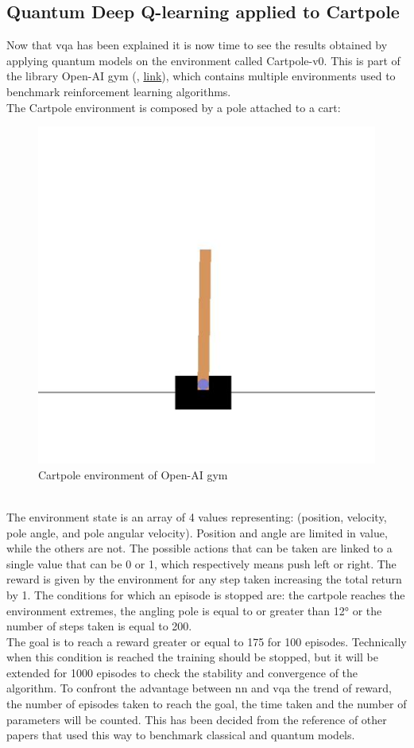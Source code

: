 \subsection{Quantum Deep Q-learning applied to Cartpole} 
Now that \acrlong{vqa} has been explained it is now time to see the results obtained by applying quantum models on the environment called Cartpole-v0. This is part of the library Open-AI gym (\cite{1606.01540}, \href{https://www.gymlibrary.ml/}{link}), which contains multiple environments used to benchmark reinforcement learning algorithms.\\
The Cartpole environment is composed by a pole attached to a cart:
\begin{figure}[h]
	\centering
	\includegraphics[width=0.7\linewidth]{img/cartpole}
	\caption[Cartpole environment]{Cartpole environment of Open-AI gym}
	\label{fig:cartpole}
\end{figure}\\
The environment state is an array of 4 values representing: (position, velocity, pole angle, and pole angular velocity). Position and angle are limited in value, while the others are not. The possible actions that can be taken are linked to a single value that can be 0 or 1, which respectively means push left or right. The reward is given by the environment for any step taken increasing the total return by 1. The conditions for which an episode is stopped are: the cartpole reaches the environment extremes, the angling pole is equal to or greater than 12° or the number of steps taken is equal to 200.\\
The goal is to reach a reward greater or equal to 175 for 100 episodes. Technically when this condition is reached the training should be stopped, but it will be extended for 1000 episodes to check the stability and convergence of the algorithm. To confront the advantage between \acrlong{nn} and \acrlong{vqa}  the trend of reward, the number of episodes taken to reach the goal, the time taken and the number of parameters will be counted.
This has been decided from the reference of other papers that used this way to benchmark classical and quantum models.
